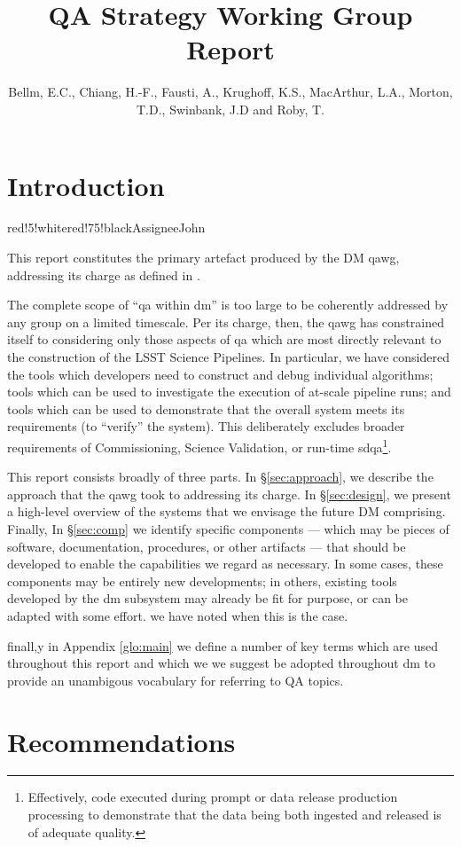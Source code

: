\documentclass[DM,authoryear,toc,lsstdraft]{lsstdoc}
\title{QA Strategy Working Group Report}
\author{%
Bellm, E.C.,
Chiang, H.-F.,
Fausti, A.,
Krughoff, K.S.,
MacArthur, L.A.,
Morton, T.D.,
Swinbank, J.D and
Roby, T.
}
\date{\vcsDate}
\makeatletter
\newcommand{\printrecs}{%
  \section{Recommendations}%
  \label{sec:recs}
  \begin{enumerate}[leftmargin=7em,label=QAWG-REC-\arabic*:]%
  \def\@noitemerr{\@latex@warning{Empty objective list}}%
  \@starttoc{rec}%
  \end{enumerate}%
}
\makeatother
\begin{document}
\newcommand{\assign}[1]{
  \begin{admonition}{red!5!white}{red!75!black}{Assignee}{}#1\end{admonition}
}

\maketitle


\section{Introduction}
\label{sec:intro}

\assign{John}

This report constitutes the primary artefact produced by the DM \gls{qawg},
addressing its charge as defined in .

The complete scope of ``\gls{qa} within \gls{dm}'' is too large to be
coherently addressed by any group on a limited timescale. Per its charge,
then, the \gls{qawg} has constrained itself to considering only those aspects
of \gls{qa} which are most directly relevant to the construction of the LSST
Science Pipelines. In particular, we have considered the tools which
developers need to construct and debug individual algorithms; tools which can
be used to investigate the execution of at-scale pipeline runs; and tools
which can be used to demonstrate that the overall system meets its
requirements (to ``verify'' the system). This deliberately excludes broader
requirements of Commissioning, Science Validation, or run-time
\gls{sdqa}\footnote{Effectively, code executed during prompt or data release
production processing to demonstrate that the data being both ingested and
released is of adequate quality.}.

This report consists broadly of three parts. In \S\ref{sec:approach}, we
describe the approach that the \gls{qawg} took to addressing its charge. In
\S\ref{sec:design}, we present a high-level overview of the systems that we
envisage the future DM comprising. Finally, In \S\ref{sec:comp} we identify
specific components --- which may be pieces of software, documentation,
procedures, or other artifacts --- that should be developed to enable the
capabilities we regard as necessary. In some cases, these components may be
entirely new developments; in others, existing tools developed by the \gls{dm}
subsystem may already be fit for purpose, or can be adapted with some effort.
we have noted when this is the case.

finall,y in Appendix \ref{glo:main} we define a number of key terms which are
used throughout this report and which we we suggest be adopted throughout
\gls{dm} to provide an unambigous vocabulary for referring to QA topics.





\appendix
\printrecs
\glsaddall
\renewcommand*{\glsautoprefix}{glo:}
\printglossary[style=index,numberedsection=autolabel]



\end{document}
